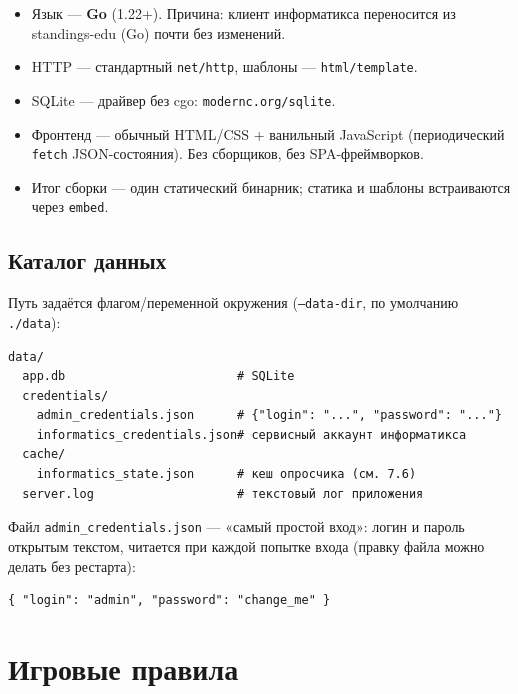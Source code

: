 \documentclass[12pt,a4paper]{article}
\newcommand{\field}[1]{\texttt{#1}}
\begin{document}
\begin{itemize}[nosep]
  \item Язык --- \textbf{Go} (1.22+). Причина: клиент информатикса
        переносится из standings-edu (Go) почти без изменений.
  \item HTTP --- стандартный \field{net/http}, шаблоны ---
        \field{html/template}.
  \item SQLite --- драйвер без cgo: \field{modernc.org/sqlite}.
  \item Фронтенд --- обычный HTML/CSS + ванильный JavaScript
        (периодический \field{fetch} JSON-состояния). Без сборщиков,
        без SPA-фреймворков.
  \item Итог сборки --- один статический бинарник; статика и шаблоны
        встраиваются через \field{embed}.
\end{itemize}

\subsection{Каталог данных}

Путь задаётся флагом/переменной окружения (\field{--data-dir},
по умолчанию \field{./data}):

\begin{small}\begin{verbatim}
data/
  app.db                        # SQLite
  credentials/
    admin_credentials.json      # {"login": "...", "password": "..."}
    informatics_credentials.json# сервисный аккаунт информатикса
  cache/
    informatics_state.json      # кеш опросчика (см. 7.6)
  server.log                    # текстовый лог приложения
\end{verbatim}\end{small}

Файл \field{admin\_credentials.json} --- «самый простой вход»: логин и пароль
открытым текстом, читается при каждой попытке входа (правку файла можно
делать без рестарта):

\begin{small}\begin{verbatim}
{ "login": "admin", "password": "change_me" }
\end{verbatim}\end{small}

\section{Игровые правила}
\label{sec:rules}
\end{document}
